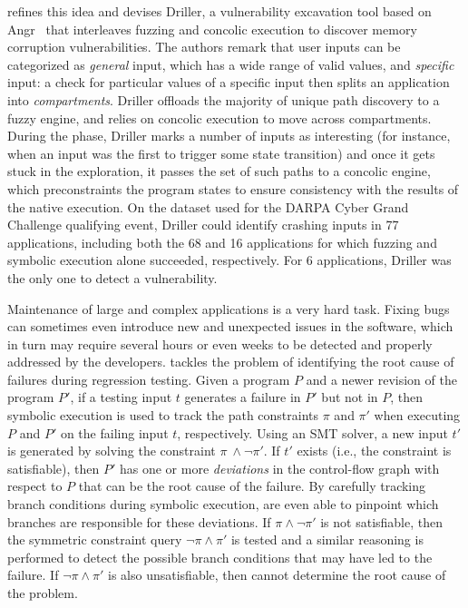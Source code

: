 \cite{DRILLER-NDSS16} refines this idea and devises Driller, a vulnerability excavation tool based on {\sc Angr}~\cite{ANGR-SSP16} that interleaves fuzzing and concolic execution to discover memory corruption vulnerabilities. The authors remark that user inputs can be categorized as {\em general} input, which has a wide range of valid values, and {\em specific} input: a check for particular values of a specific input then splits an application into {\em compartments}. Driller offloads the majority of unique path discovery to a fuzzy engine, and relies on concolic execution to move across compartments. During the  phase, Driller marks a number of inputs as interesting (for instance, when an input was the first to trigger some state transition) and once it gets stuck in the exploration, it passes the set of such paths to a concolic engine, which preconstraints the program states to ensure consistency with the results of the native execution. On the dataset used for the DARPA Cyber Grand Challenge qualifying event, Driller could identify crashing inputs in 77 applications, including both the 68 and 16 applications for which fuzzing and symbolic execution alone succeeded, respectively. For 6 applications, Driller was the only one to detect a vulnerability.

Maintenance of large and complex applications is a very hard task. Fixing bugs can sometimes even introduce new and unexpected issues in the software, which in turn may require several hours or even weeks to be detected and properly addressed by the developers. \cite{QRL-TOSEM12} tackles the problem of identifying the root cause of failures during regression testing. Given a program $P$ and a newer revision of the program $P'$, if a testing input $t$ generates a failure in $P'$ but not in  $P$, then symbolic execution is used to track the path constraints $\pi$ and $\pi'$ when executing $P$ and $P'$ on the failing input $t$, respectively. Using an SMT solver, a new input $t'$ is generated by solving the constraint $\pi ~\wedge \neg\pi'$. If $t'$ exists (i.e., the constraint is satisfiable), then $P'$ has one or more {\em deviations} in the control-flow graph with respect to $P$ that can be the root cause of the failure. By carefully tracking branch conditions during symbolic execution, \cite{QRL-TOSEM12} are even able to pinpoint which branches are responsible for these deviations. If $\pi \wedge \neg\pi'$ is not satisfiable, then the symmetric constraint query $\neg\pi \wedge \pi'$ is tested and a similar reasoning is performed to detect the possible branch conditions that may have led to the failure. If $\neg\pi \wedge \pi'$ is also unsatisfiable, then  cannot determine the root cause of the problem.

